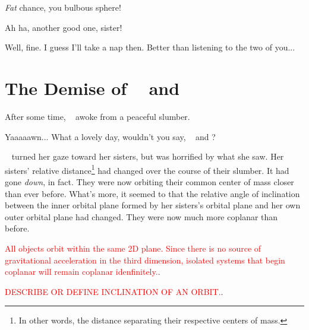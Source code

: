 \documentclass[main.tex]{subfiles}
\begin{document}
\par \Taygete \textit{Fat} chance, you bulbous sphere!

\par \Alcyone Ah ha, another good one, sister!

\par \Celaeno Well, fine.  I guess I'll take a nap then.  Better than listening to the two of you...

\section{The Demise of \rmtaygete~ and \rmalcyone}

\par \nar After some time, \rmcelaeno~ awoke from a peaceful slumber.  

\par \Celaeno Yaaaaawn... What a lovely day, wouldn't you say, \rmtaygete~ and \rmalcyone?

\par \nar \rmcelaeno~ turned her gaze toward her sisters, but was horrified by what she saw.  Her sisters' relative distance\footnote{In other words, the distance separating their respective centers of mass.} had changed over the course of their slumber.  It had gone \textit{down}, in fact.  They were now orbiting their common center of mass closer than ever before.  What's more, it seemed to \rmcelaeno that the relative angle of inclination between the inner orbital plane formed by her sisters's orbital plane and her own outer orbital plane had changed.  They were now much more coplanar than before.


\begin{tcolorbox}[sharp corners, colback=red!30, colframe=red!80!blue, title=Coplanar]
\par \textcolor{red}{All objects orbit within the same 2D plane. Since there is no source of gravitational acceleration in the third dimension, isolated systems that begin coplanar will remain coplanar idenfinitely.}.  
\end{tcolorbox}

\begin{tcolorbox}[sharp corners, colback=red!30, colframe=red!80!blue, title=Orbital Inclination]
\par \textcolor{red}{DESCRIBE OR DEFINE INCLINATION OF AN ORBIT.}.  
\end{tcolorbox}
\end{document}
